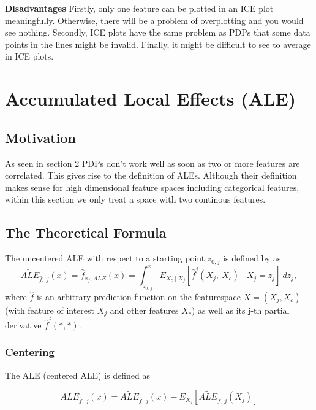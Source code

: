 \documentclass[
]{krantz}
\begin{document}
\textbf{Disadvantages}
Firstly, only one feature can be plotted in an ICE plot meaningfully. Otherwise, there will be a problem of overplotting and you would see nothing. Secondly, ICE plots have the same problem as PDPs that some data points in the lines might be invalid. Finally, it might be difficult to see to average in ICE plots.\citep{molnar2019}

\hypertarget{accumulated-local-effects-ale}{%
\chapter{Accumulated Local Effects (ALE)}\label{accumulated-local-effects-ale}}

\hypertarget{motivation}{%
\section{Motivation}\label{motivation}}

As seen in section 2 PDPs don't work well as soon as two or more features are correlated. This gives rise to the definition of ALEs. Although their definition makes sense for high dimensional feature spaces including categorical features, within this section we only treat a space with two continous features.

\hypertarget{the-theoretical-formula}{%
\section{The Theoretical Formula}\label{the-theoretical-formula}}

The uncentered ALE with respect to a starting point \(z_{0, j}\) is defined by \citep{Apley2016} as
\[  \widetilde{ALE}_{\hat{f},~j}(x) = \hat{f}_{x_j,ALE}(x) = \int_{z_{0,~j}}^{x} E_{X_c \mid X_j} [\hat{f}^j(X_j,~X_c)\mid X_j = z_j]~dz_j,\]
where \(\hat{f}\) is an arbitrary prediction function on the featurespace \(X = (X_j,X_c)\) (with feature of interest \(X_j\) and other features \(X_c\)) as well as its j-th partial derivative \(\hat{f}^j(*,*)\).

\hypertarget{centering}{%
\subsection{Centering}\label{centering}}

The ALE (centered ALE) is defined as

\[  ALE_{\hat{f},~j}(x) = \widetilde{ALE}_{\hat{f},~j}(x) - E_{X_j}[\widetilde{ALE}_{\hat{f},~j}(X_j)]\]
\end{document}
